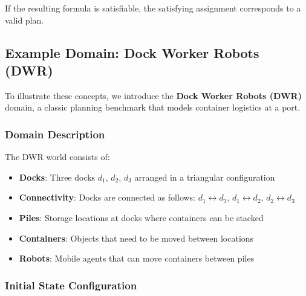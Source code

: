 \documentclass[11pt,a4paper]{article}
\theoremstyle{definition}
\theoremstyle{plain}
\theoremstyle{remark}
\begin{document}
If the resulting formula is satisfiable, the satisfying assignment corresponds to a valid plan.

\subsection{Example Domain: Dock Worker Robots (DWR)}

To illustrate these concepts, we introduce the \textbf{Dock Worker Robots (DWR)} domain, a classic planning benchmark that models container logistics at a port.

\subsubsection{Domain Description}

The DWR world consists of:

\begin{itemize}
    \item \textbf{Docks}: Three docks $d_1$, $d_2$, $d_3$ arranged in a triangular configuration
    \item \textbf{Connectivity}: Docks are connected as follows: $d_1 \leftrightarrow d_3$, $d_1 \leftrightarrow d_2$, $d_2 \leftrightarrow d_3$
    \item \textbf{Piles}: Storage locations at docks where containers can be stacked
    \item \textbf{Containers}: Objects that need to be moved between locations
    \item \textbf{Robots}: Mobile agents that can move containers between piles
\end{itemize}

\begin{center}
\end{center}

\subsubsection{Initial State Configuration}
\end{document}

